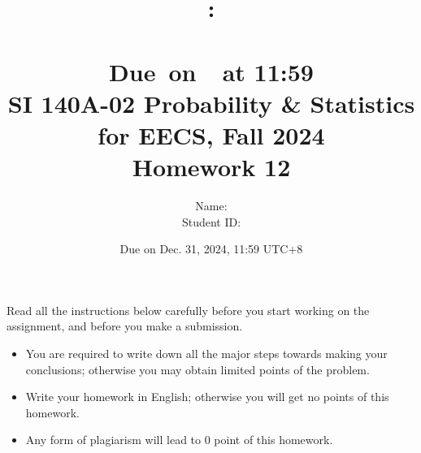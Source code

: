 \documentclass[a4paper]{article}
\title{
    \vspace{2in}
    \textmd{\textbf{\hmwkClass:\\  \hmwkTitle}}\\
    \normalsize\vspace{0.1in}\small{Due\ on\ \hmwkDueDate\ at 11:59}\\
	\vspace{4in}
}
\author{
	Name: \textbf{\hmwkAuthorName} \\
	Student ID: \hmwkAuthorID}
\date{}
\begin{document}

\date{
Due on Dec. 31, 2024, 11:59 UTC+8}
\title{SI 140A-02  Probability \& Statistics for EECS, Fall 2024 \\
Homework 12}
\maketitle
Read all the instructions below carefully before you start working on the assignment, and before you make a submission.
\begin{itemize}
    \item You are required to write down all the major steps towards making your conclusions; otherwise you may obtain limited points of the problem.
    \item Write your homework in English; otherwise you will get no points of this homework.
    \item Any form of plagiarism will lead to $0$ point of this homework. 
\end{itemize}
\newpage
\end{document}
